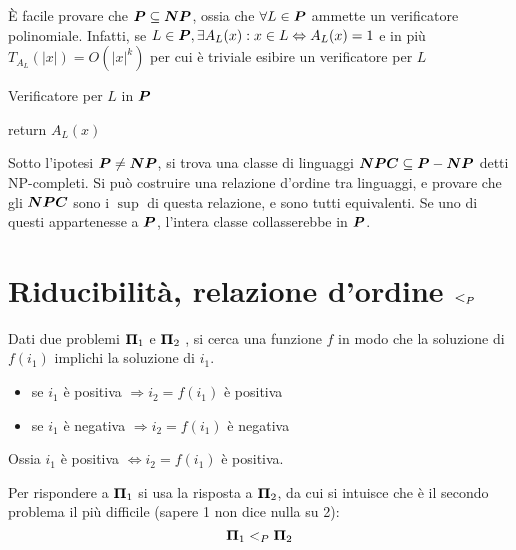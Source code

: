 È facile provare che $\bm{P}{} \subseteq \bm{NP}{}$, ossia che $\forall L \in \bm{P}{}$ ammette un verificatore polinomiale. Infatti, se $L \in \bm{P}{}, \exists A_{L}(x) : x \in L \Leftrightarrow A_L (x) = 1$ e in più $T_{A_{L}} (|x|) = O \left( |x|^{k} \right)$ per cui è triviale esibire un verificatore per $L$
\begin{algorithm}[H]
    \caption{Verificatore per $L$ in $\bm{P}{}$}\label{alg:verificap}
\begin{algorithmic}[1]
        \State return $A_L (x)$
    \EndProcedure
\end{algorithmic}
\end{algorithm}

Sotto l'ipotesi $\bm{P}{} \neq \bm{NP}{} $, si trova una classe di linguaggi $\bm{NPC}{} \subseteq \bm{P}{} - \bm{NP}{} $ detti NP-completi. Si può costruire una relazione d'ordine tra linguaggi, e provare che gli $\bm{NPC}{}$ sono i $\sup$ di questa relazione, e sono tutti equivalenti. Se uno di questi appartenesse a $\bm{P}{}$, l'intera classe collasserebbe in $\bm{P}{}$.



\section{Riducibilità, relazione d'ordine $<_P$}
\label{sse:relazioneordinelp}

Dati due problemi
$\bm{\Pi}{}_1$
e
$\bm{\Pi}{}_2$
, si cerca una funzione $f$ in modo che la soluzione di $f(i_1)$ implichi la soluzione di $i_1$.
\begin{itemize}[noitemsep,parsep=0pt,partopsep=0pt,topsep=0pt]
    \item se $i_1$ è positiva $\Rightarrow i_2 = f(i_1)$ è positiva
    \item se $i_1$ è negativa $\Rightarrow i_2 = f(i_1)$ è negativa
\end{itemize}
Ossia $i_1$ è positiva $\Leftrightarrow i_2 = f(i_1)$ è positiva.

Per rispondere a $\bm{\Pi}{}_1$ si usa la risposta a $\bm{\Pi}{}_2$, da cui si intuisce che è il secondo problema il più difficile (sapere 1 non dice nulla su 2):
\begin{equation*}
\bm{\Pi}{}_1
<_P
\bm{\Pi}_2
\end{equation*}

